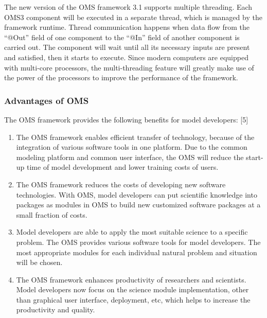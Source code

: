 The new version of the OMS framework 3.1 supports multiple threading. Each OMS3 component will be executed in a separate thread, which is managed by the framework runtime. Thread communication happens when data flow from the “@Out” field of one component to the “@In” field of another component is carried out. The component will wait until all its necessary inputs are present and satisfied, then it starts to execute. Since modern computers are equipped with multi-core processors, the multi-threading feature will greatly make use of the power of the processors to improve the performance of the framework.
\par
\subsubsection{Advantages of OMS}
\par
The OMS framework provides the following benefits for model developers: [5]
\begin{enumerate}
\item The OMS framework enables efficient transfer of technology, because of the  integration of various software tools in one platform. Due to the common modeling platform and common user interface, the OMS will reduce the start-up time of model development and lower training costs of users.

\item The OMS framework reduces the costs of developing new software technologies. With OMS, model developers can put scientific knowledge into packages as modules in OMS to build new customized software packages at a small fraction of costs.

\item Model developers are able to apply the most suitable science to a specific problem. The OMS provides various software tools for model developers. The most appropriate modules for each individual natural problem and situation will be chosen.

\item The OMS framework enhances productivity of researchers and scientists. Model developers now focus on the science module implementation, other than graphical user interface, deployment, etc, which helps to increase the productivity and quality.

\end{enumerate}
